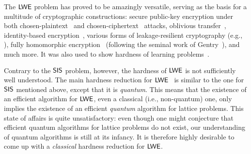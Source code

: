 The $\mathsf{LWE}$ problem has proved to be amazingly versatile, serving as
the basis for a multitude of cryptographic constructions:
secure public-key encryption under both
chosen-plaintext~\cite{DBLP:journals/jacm/Regev09,DBLP:conf/crypto/PeikertVW08,DBLP:conf/ctrsa/LindnerP11}
and
chosen-ciphertext~\cite{DBLP:conf/stoc/PeikertW08,DBLP:conf/stoc/Peikert09,DBLP:conf/eurocrypt/MicciancioP12}
attacks, oblivious transfer~\cite{DBLP:conf/crypto/PeikertVW08},
identity-based
encryption~\cite{DBLP:conf/stoc/GentryPV08,DBLP:conf/eurocrypt/CashHKP10,DBLP:conf/eurocrypt/AgrawalBB10,DBLP:conf/crypto/AgrawalBB10},
various forms of leakage-resilient cryptography (e.g.,
\cite{DBLP:conf/tcc/AkaviaGV09,DBLP:conf/crypto/ApplebaumCPS09,DBLP:conf/innovations/GoldwasserKPV10}),
fully homomorphic
encryption~\cite{DBLP:conf/focs/BrakerskiV11,DBLP:conf/innovations/BrakerskiGV12,DBLP:conf/crypto/Brakerski12}
(following the seminal work of Gentry~\cite{DBLP:conf/stoc/Gentry09}),
and much more. It was also used to show hardness of learning problems~\cite{DBLP:conf/focs/KlivansS06}.

Contrary to the $\mathsf{SIS}$ problem, however, the hardness of $\mathsf{LWE}$ is not
sufficiently well understood. The main hardness reduction for
$\mathsf{LWE}$~\cite{DBLP:journals/jacm/Regev09} is similar to the one for $\mathsf{SIS}$
mentioned above, except that it is \emph{quantum}. This means that
the existence of an efficient algorithm for $\mathsf{LWE}$, even
a classical (i.e., non-quantum) one, only implies the existence
of an efficient \emph{quantum} algorithm for lattice problems.
This state of affairs is quite unsatisfactory: even though
one might conjecture that efficient quantum algorithms for lattice
problems do not exist, our understanding of quantum algorithms
is still at its infancy. It is therefore highly desirable to
come up with a \emph{classical} hardness reduction for $\mathsf{LWE}$.

